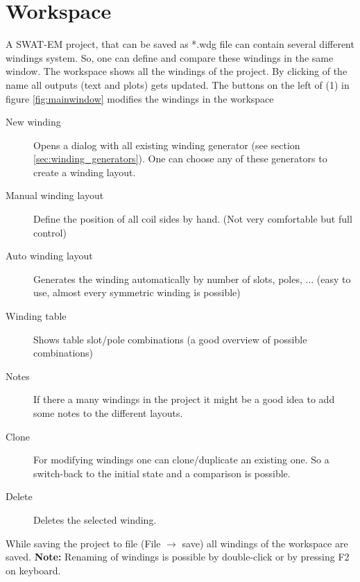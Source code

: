 \documentclass[]{scrreprt}
\begin{document}
\section{Workspace}\label{sec:workspace}
A SWAT-EM project, that can be saved as *.wdg file can contain several different windings system.
So, one can define and compare these windings in the same window. The workspace shows all
the windings of the project. By clicking of the name all outputs (text and plots) gets updated.
The buttons on the left of (1) in figure \ref{fig:mainwindow} modifies the windings in the workspace
\begin{description}
 \item[New winding] Opens a dialog with all existing winding generator (see section \ref{sec:winding_generators}). 
		    One can choose any of these generators to create a winding layout.
 \item[Manual winding layout] Define the position of all coil sides by hand. (Not very comfortable
		    but full control)
 \item[Auto winding layout] Generates the winding automatically by number of slots, poles, ... (easy
                            to use, almost every symmetric winding is possible)
 \item[Winding table] Shows table slot/pole combinations (a good overview of possible combinations) 
 \item[Notes] If there a many windings in the project it might be a good idea to add some notes
              to the different layouts.
 \item[Clone] For modifying windings one can clone/duplicate an existing one. So a switch-back to the 
              initial state and a comparison is possible.
 \item[Delete] Deletes the selected winding.
\end{description}
%
While saving the project to file (File $\rightarrow$ save) all windings of the workspace are saved. 
\textbf{Note:} Renaming of windings is possible by double-click or by pressing F2 on keyboard.
%
%
\end{document}

